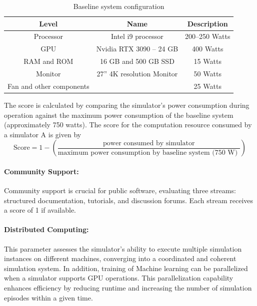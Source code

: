 \documentclass[12pt,twoside,a4paper,parskip]{scrbook} %
\begin{document}
\begin{table}[htbp]
  \centering
  
  \begin{minipage}{\linewidth}
    \renewcommand{\arraystretch}{1.0} 
    \begin{tabular}{|c|c|c|}
      \hline
      \textbf{Level} & \textbf{Name} & \textbf{Description} \\
      \hline
        Processor & Intel i9 processor & 200--250 Watts \\ \hline 
        GPU & Nvidia RTX 3090 – 24 GB & 400 Watts \\ \hline 
        RAM and ROM & 16 GB and 500 GB SSD & 15 Watts \\ \hline 
        Monitor & 27” 4K resolution Monitor & 50 Watts \\ \hline
        Fan and other components & & 25 Watts \\ \hline
        \end{tabular}
  \end{minipage}
  \caption{Baseline system configuration}
  \label{tab:systab}
\end{table}
The score is calculated by comparing the simulator's power consumption during operation against the maximum power consumption of the baseline system (approximately 750 watts). 
The score for the computation resource consumed by a simulator A is given by  
\[ \text{Score} = 1 - \left(\frac{\text{power consumed by simulator}}{\text{maximum power consumption by baseline system (750 W) }}\right) \]

\paragraph*{Community Support:}
Community support is crucial for public software, evaluating three streams: structured documentation, tutorials, and discussion forums. Each stream receives a score of 1 if available.

\paragraph* {Distributed Computing:}
This parameter assesses the simulator's ability to execute multiple simulation instances on different machines, converging into a coordinated and coherent simulation system. In addition, training of Machine learning can be parallelized when a simulator supports GPU operations.  This parallelization capability enhances efficiency by reducing runtime and increasing the number of simulation episodes within a given time. 
\end{document}

